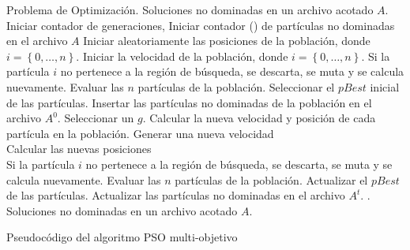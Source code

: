   \begin{algorithm}
  \begin{algorithmic}[1]
	\REQUIRE Problema de Optimizaci\'on.
	\ENSURE Soluciones no dominadas en un archivo acotado $A$.
		\STATE Iniciar contador de generaciones, \DIFdelbegin {}\DIFdelend \DIFaddbegin {}\DIFaddend \STATE Iniciar contador (\DIFdelbegin {}\DIFdelend \DIFaddbegin {}\DIFaddend ) de part\'iculas no dominadas en el archivo $A$
		\STATE Iniciar aleatoriamente las posiciones \DIFdelbegin {}\DIFdelend \DIFaddbegin {}\DIFaddend de la poblaci\'on, donde $i=\left\{0,\ldots,n\right\}$.		
		\STATE Iniciar la velocidad \DIFdelbegin {}\DIFdelend \DIFaddbegin {}\DIFaddend de la poblaci\'on, donde $i=\left\{0,\ldots,n\right\}$.
		\STATE Si la part\'icula $i$ no pertenece a la regi\'on de b\'usqueda, se descarta, se muta y se calcula nuevamente.	 
		\STATE Evaluar las $n$ part\'iculas de la poblaci\'on.
		\STATE Seleccionar el $pBest$ inicial de las part\'iculas.  
		\STATE Insertar las part\'iculas no dominadas de la poblaci\'on en el archivo $A^{0}$.
			\STATE Seleccionar un $g$.
			\STATE Calcular la nueva velocidad y posici\'on de cada part\'icula en la poblaci\'on.
			    \STATE Generar una nueva velocidad 
			      \\ \DIFdelbegin {}\DIFdelend \DIFaddbegin {}\DIFaddend \STATE Calcular las nuevas posiciones 
				\\\DIFdelbegin {}\DIFdelend \DIFaddbegin {}\DIFaddend \ENDFOR
			\STATE Si la part\'icula $i$ no pertenece a la regi\'on de b\'usqueda, se descarta, se muta y se calcula nuevamente.
			\STATE Evaluar las $n$ part\'iculas de la poblaci\'on.	
			\STATE Actualizar el $pBest$ de las part\'iculas.  
			\STATE Actualizar las part\'iculas no dominadas en el archivo $A^{t}$.
			\STATE \DIFdelbegin {}\DIFdelend \DIFaddbegin {}\DIFaddend .
	\ENDWHILE
	\RETURN Soluciones no dominadas en un archivo acotado $A$.
	\end{algorithmic}
	\caption{Pseudoc\'odigo del algoritmo PSO multi-objetivo}
	\label{alg:MOPSO}
	\end{algorithm}

